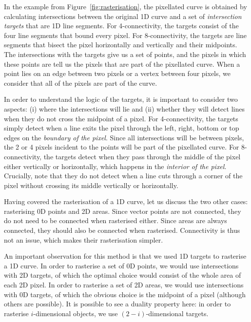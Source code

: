 In the example from Figure~\ref{fig:rasterisation}, the pixellated curve is obtained by calculating intersections between the original 1D curve and a set of \emph{intersection targets} that are 1D line segments.
For 4-connectivity, the targets consist of the four line segments that bound every pixel.
For 8-connectivity, the targets are line segments that bisect the pixel horizontally and vertically and their midpoints.
The intersections with the targets give us a set of points, and the pixels in which these points are tell us the pixels that are part of the pixellated curve.
When a point lies on an edge between two pixels or a vertex between four pixels, we consider that all of the pixels are part of the curve.

In order to understand the logic of the targets, it is important to consider two aspects: (i) where the intersections will lie and (ii) whether they will detect lines when they do not cross the midpoint of a pixel.
For 4-connectivity, the targets simply detect when a line exits the pixel through the left, right, bottom or top edges on the \emph{boundary of the pixel}.
Since all intersections will be between pixels, the 2 or 4 pixels incident to the points will be part of the pixellated curve.
For 8-connectivity, the targets detect when they pass through the middle of the pixel either vertically or horizontally, which happens in the \emph{interior of the pixel}.
Crucially, note that they do not detect when a line cuts through a corner of the pixel without crossing its middle vertically or horizontally.

Having covered the rasterisation of a 1D curve, let us discuss the two other cases: rasterising 0D points and 2D areas.
Since vector points are not connected, they do not need to be connected when rasterised either.
Since areas are always connected, they should also be connected when rasterised.
Connectivity is thus not an issue, which makes their rasterisation simpler.

An important observation for this method is that we used 1D targets to rasterise a 1D curve.
In order to rasterise a set of 0D points, we would use intersections with 2D targets, of which the optimal choice would consist of the whole area of each 2D pixel.
In order to rasterise a set of 2D areas, we would use intersections with 0D targets, of which the obvious choice is the midpoint of a pixel (although others are possible).
It is possible to see a duality property here: in order to rasterise \(i\)-dimensional objects, we use \((2-i)\)-dimensional targets.

